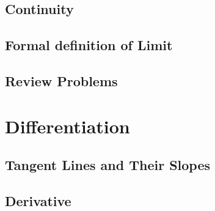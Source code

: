 \documentclass[12pt]{memoir}
\begin{document}
    \section{Continuity}
    
    \section{Formal definition of Limit}
    
    \section{Review Problems}
    
%     
%     


\chapter{Differentiation}
    \section{Tangent Lines and Their Slopes}
    
    \section{Derivative}
    
\end{document}
